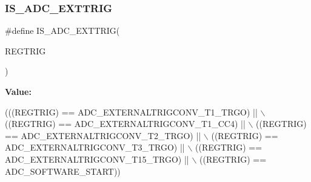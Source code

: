 \subsubsection{\texorpdfstring{I\+S\+\_\+\+A\+D\+C\+\_\+\+E\+X\+T\+T\+R\+IG}{IS\_ADC\_EXTTRIG}}
{\footnotesize\ttfamily \#define I\+S\+\_\+\+A\+D\+C\+\_\+\+E\+X\+T\+T\+R\+IG(\begin{DoxyParamCaption}\item[{}]{R\+E\+G\+T\+R\+IG }\end{DoxyParamCaption})}

{\bfseries Value\+:}
\begin{DoxyCode}
(((REGTRIG) == ADC\_EXTERNALTRIGCONV\_T1\_TRGO)  || \(\backslash\)
                                 ((REGTRIG) == ADC\_EXTERNALTRIGCONV\_T1\_CC4)   || \(\backslash\)
                                 ((REGTRIG) == ADC\_EXTERNALTRIGCONV\_T2\_TRGO)  || \(\backslash\)
                                 ((REGTRIG) == ADC\_EXTERNALTRIGCONV\_T3\_TRGO)  || \(\backslash\)
                                 ((REGTRIG) == ADC\_EXTERNALTRIGCONV\_T15\_TRGO) || \(\backslash\)
                                 ((REGTRIG) == ADC\_SOFTWARE\_START))
\end{DoxyCode}
